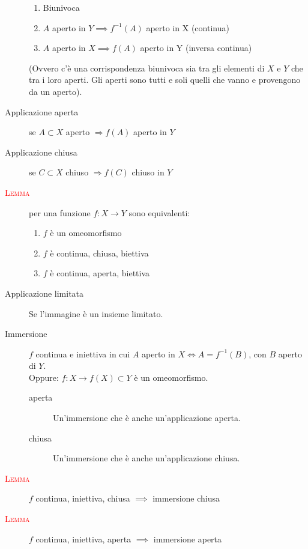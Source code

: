 \documentclass[a4paper,10pt]{article}
\newcommand{\myth}{\normalfont \scshape \textcolor{red}}
\theoremstyle{remark}
\theoremstyle{definition}
\begin{document}
\begin{description}
\begin{enumerate}
        \item Biunivoca
        \item $A$ aperto in $Y \implies f^{-1}(A)$ aperto in X (continua)
        \item $A$ aperto in $X \implies f(A)$ aperto in Y (inversa continua)
    \end{enumerate}
    (Ovvero c'è una corrispondenza biunivoca sia tra gli elementi di $X$ e $Y$ che tra i loro aperti. Gli aperti sono tutti e soli quelli che vanno e  provengono da un aperto). 
    \item[Applicazione aperta] se $A \subset X$ aperto $\Rightarrow f(A)$ aperto in $Y$
    \item[Applicazione chiusa] se $C \subset X$ chiuso $\Rightarrow f(C)$ chiuso in $Y$ 
    \item[\myth{Lemma}] per una funzione $f:X\to Y$ sono equivalenti:
    \begin{enumerate}
        \item $f$ è un omeomorfismo
        \item $f$ è continua, chiusa, biettiva
        \item $f$ è continua, aperta, biettiva
    \end{enumerate}
    \item[Applicazione limitata] Se l'immagine è un insieme limitato.
    \item[Immersione] $f$ continua e iniettiva in cui $A$ aperto in $X \iff A = f^{-1}(B)$, con $B$ aperto di $Y$.
    \\Oppure: $f: X \to f(X) \subset Y$ è un omeomorfismo.
    \begin{description}
        \item[aperta] Un'immersione che è anche un'applicazione aperta.
        \item[chiusa] Un'immersione che è anche un'applicazione chiusa.
    \end{description}
    
    \item[\myth{Lemma}] $f$ continua, iniettiva, chiusa $\implies$ immersione chiusa 
    \item[\myth{Lemma}] $f$ continua, iniettiva, aperta $\implies$ immersione aperta 
    

\end{description}
\end{document}
